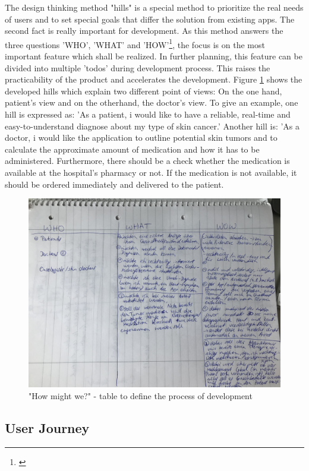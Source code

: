 The design thinking method "hills" is a special method to prioritize the real needs of users and to set special goals that differ the solution from existing apps. The second fact is really important for development. As this method answers the three questions 'WHO', 'WHAT' and 'HOW'\footnote{\cite{ibm_edt}}, the focus is on the most important feature which shall be realized. In further planning, this feature can be divided into multiple 'todos'  during development process. This raises the practicability of the product and accelerates the development. Figure \ref{hills} shows the developed hills which explain two different point of views: On the one hand, patient's view and on the otherhand, the doctor's view.
To give an example, one hill is expressed as: 'As a patient, i would like to have a reliable, real-time and easy-to-understand diagnose about my type of skin cancer.'
Another hill is: 'As a doctor, i would like the application to outline potential skin tumors and to calculate the  approximate amount of medication and how it has to be administered. Furthermore, there should be a check whether the medication is available at the hospital's pharmacy or not. If the medication is not available, it should be ordered immediately and delivered to the patient.

\begin{figure}[h!]
	\centering
	\includegraphics[width=1\textwidth]{images/hills.jpg}
	\caption{"How might we?" - table to define the process of development}
	\label{hills}
\end{figure}

\subsection{User Journey}

